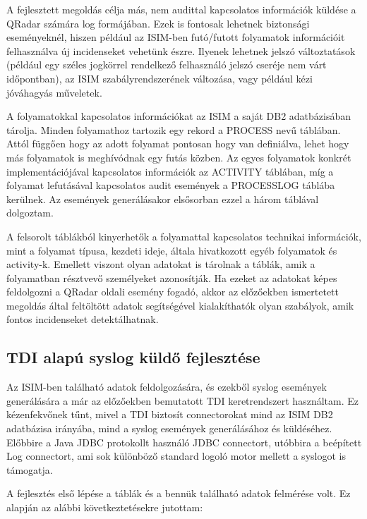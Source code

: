 A fejlesztett megoldás célja más, nem audittal kapcsolatos információk küldése a QRadar számára log formájában. Ezek is fontosak lehetnek biztonsági eseményeknél, hiszen például az ISIM-ben futó/futott folyamatok információit felhasználva új incidenseket vehetünk észre. Ilyenek lehetnek jelszó változtatások (például egy széles jogkörrel rendelkező felhasználó jelszó cseréje nem várt időpontban), az ISIM szabályrendszerének változása, vagy például kézi jóváhagyás műveletek. 

A folyamatokkal kapcsolatos információkat az ISIM a saját DB2 adatbázisában tárolja. Minden folyamathoz tartozik egy rekord a PROCESS nevű táblában. Attól függően hogy az adott folyamat pontosan hogy van definiálva, lehet hogy más folyamatok is meghívódnak egy futás közben. Az egyes folyamatok konkrét implementációjával kapcsolatos információk az ACTIVITY táblában, míg a folyamat lefutásával kapcsolatos audit események a PROCESSLOG táblába kerülnek. Az események generálásakor elsősorban ezzel a három táblával dolgoztam.

A felsorolt táblákból kinyerhetők a folyamattal kapcsolatos technikai információk, mint a folyamat típusa, kezdeti ideje, általa hivatkozott egyéb folyamatok és activity-k. Emellett viszont olyan adatokat is tárolnak a táblák, amik a folyamatban résztvevő személyeket azonosítják. Ha ezeket az adatokat képes feldolgozni a QRadar oldali esemény fogadó, akkor az előzőekben ismertetett megoldás által feltöltött adatok segítségével kialakíthatók olyan szabályok, amik fontos incidenseket detektálhatnak.
 
\subsection{TDI alapú syslog küldő fejlesztése}
Az ISIM-ben található adatok feldolgozására, és ezekből syslog események generálására a már az előzőekben bemutatott TDI keretrendszert használtam. Ez kézenfekvőnek tűnt, mivel a TDI biztosít connectorokat mind az ISIM DB2 adatbázisa irányába, mind a syslog események generálásához és küldéséhez. Előbbire a Java JDBC protokollt használó JDBC connectort, utóbbira a beépített Log connectort, ami sok különböző standard logoló motor mellett a syslogot is támogatja. 

A fejlesztés első lépése a táblák és a bennük található adatok felmérése volt. Ez alapján az alábbi következtetésekre jutottam:

